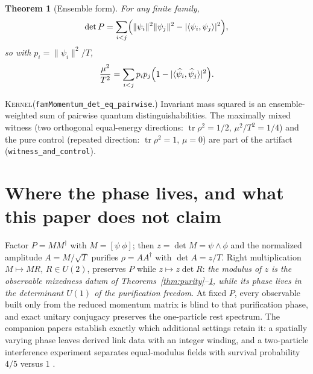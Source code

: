 \documentclass[11pt]{article}
\newcommand{\tr}{\operatorname{tr}}
\newcommand{\Kernel}{\textcolor{kernelcolor}{\textsc{Kernel}}}
\newtheorem{theorem}{Theorem}
\begin{document}
\begin{theorem}[Ensemble form]\label{thm:ensemble}
For any finite family,
\begin{equation}
 \det P=\sum_{i<j}
 \Bigl(\|\psi_i\|^2\|\psi_j\|^2-|\langle\psi_i,\psi_j\rangle|^2\Bigr),
\end{equation}
so with $p_i=\|\psi_i\|^2/T$,
\begin{equation}
 \frac{\mu^2}{T^2}
 =\sum_{i<j}p_ip_j
 \Bigl(1-|\langle\widehat\psi_i,\widehat\psi_j\rangle|^2\Bigr).
\end{equation}
\end{theorem}
\noindent\Kernel{}\quad(\texttt{famMomentum\_det\_eq\_pairwise}.)
Invariant mass squared is an ensemble-weighted sum of pairwise quantum
distinguishabilities.  The maximally mixed witness (two orthogonal
equal-energy directions: $\tr\rho^2=1/2$, $\mu^2/T^2=1/4$) and the pure
control (repeated direction: $\tr\rho^2=1$, $\mu=0$) are part of the
artifact (\texttt{witness\_and\_control}).

\section{Where the phase lives, and what this paper does not claim}

Factor $P=MM^\dagger$ with $M=[\psi\ \phi]$; then $z=\det M=\psi\wedge\phi$
and the normalized amplitude $A=M/\sqrt{T}$ purifies $\rho=AA^\dagger$ with
$\det A=z/T$.  Right multiplication $M\mapsto MR$, $R\in U(2)$, preserves
$P$ while $z\mapsto z\det R$: \emph{the modulus of $z$ is the observable
mixedness datum of Theorems~\ref{thm:purity}--\ref{thm:ensemble}, while its
phase lives in the determinant $U(1)$ of the purification freedom}.  At fixed
$P$, every observable built only from the reduced momentum matrix is blind to
that purification phase, and exact unitary conjugacy preserves the one-particle
rest spectrum.  The companion papers establish exactly which additional
settings retain it: a spatially varying phase leaves derived
link data with an integer winding, and a two-particle interference
experiment separates equal-modulus fields with survival probability
$4/5$ versus $1$ \cite{CompanionDerivation}.
\end{document}
